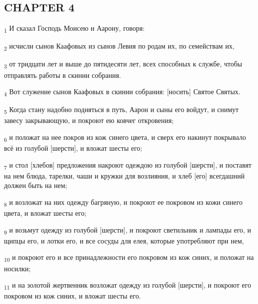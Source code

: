 \subsection{CHAPTER 4}
\begin{tcolorbox}
\textsubscript{1} И сказал Господь Моисею и Аарону, говоря:
\end{tcolorbox}
\begin{tcolorbox}
\textsubscript{2} исчисли сынов Каафовых из сынов Левия по родам их, по семействам их,
\end{tcolorbox}
\begin{tcolorbox}
\textsubscript{3} от тридцати лет и выше до пятидесяти лет, всех способных к службе, чтобы отправлять работы в скинии собрания.
\end{tcolorbox}
\begin{tcolorbox}
\textsubscript{4} Вот служение сынов Каафовых в скинии собрания: [носить] Святое Святых.
\end{tcolorbox}
\begin{tcolorbox}
\textsubscript{5} Когда стану надобно подняться в путь, Аарон и сыны его войдут, и снимут завесу закрывающую, и покроют ею ковчег откровения;
\end{tcolorbox}
\begin{tcolorbox}
\textsubscript{6} и положат на нее покров из кож синего цвета, и сверх его накинут покрывало всё из голубой [шерсти], и вложат шесты его;
\end{tcolorbox}
\begin{tcolorbox}
\textsubscript{7} и стол [хлебов] предложения накроют одеждою из голубой [шерсти], и поставят на нем блюда, тарелки, чаши и кружки для возлияния, и хлеб [его] всегдашний должен быть на нем;
\end{tcolorbox}
\begin{tcolorbox}
\textsubscript{8} и возложат на них одежду багряную, и покроют ее покровом из кожи синего цвета, и вложат шесты его;
\end{tcolorbox}
\begin{tcolorbox}
\textsubscript{9} и возьмут одежду из голубой [шерсти], и покроют светильник и лампады его, и щипцы его, и лотки его, и все сосуды для елея, которые употребляют при нем,
\end{tcolorbox}
\begin{tcolorbox}
\textsubscript{10} и покроют его и все принадлежности его покровом из кож синих, и положат на носилки;
\end{tcolorbox}
\begin{tcolorbox}
\textsubscript{11} и на золотой жертвенник возложат одежду из голубой [шерсти], и покроют его покровом из кож синих, и вложат шесты его.
\end{tcolorbox}
